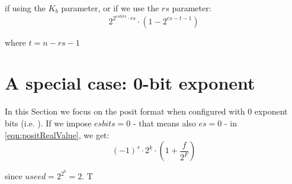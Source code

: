 if using the $K_b$ parameter, or if we use the $rs$ parameter:
\begin{equation}
    2^{2^{esbits} \cdot rs} \cdot (1 - 2^{es - t - 1})
\end{equation}

where $ t = n - rs - 1$
\section{A special case: 0-bit exponent}\label{sec:Posit0bitExponent}

In this Section we focus on the posit format when configured with 0 exponent bits (i.e. ). If we impose $esbits = 0$ - that means also $es = 0$ - in \ref{eqn:positRealValue}, we get:
\begin{equation}\label{eqn:positRealValueExp0}
    (-1)^s \cdot \text{2}^{k} \cdot \left ( 1+ \frac{f}{2^F} \right)
\end{equation}

since $useed = 2^{2^0} = 2$. T


